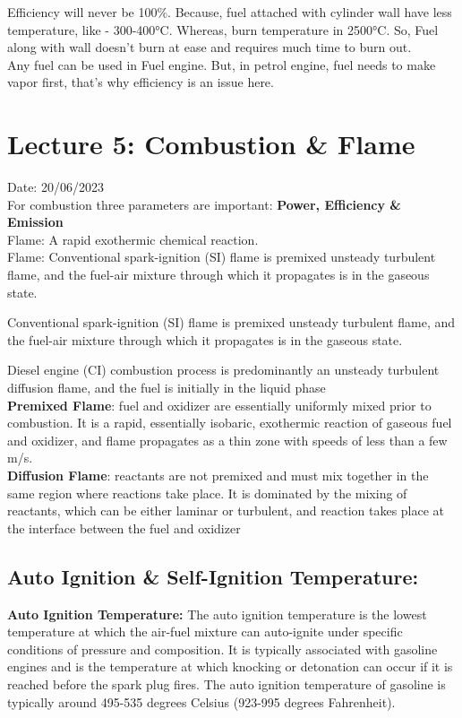 \documentclass{article}
\begin{document}
  Efficiency will never be 100\%. Because, fuel attached with cylinder wall have less temperature, like - 300-400°C. Whereas, burn temperature in 2500°C. So, Fuel along with wall doesn't burn at ease and requires much time to burn out. \\

  Any fuel can be used in Fuel engine. But, in petrol engine, fuel needs to make vapor first, that's why efficiency is an issue here. 

  \vspace*{0.5cm}
  \section{Lecture 5: Combustion \& Flame}
  \hfill Date: 20/06/2023 \\

  For combustion three parameters are important: \textbf{Power, Efficiency \& Emission}\\


  \textbullet Flame: A rapid exothermic chemical reaction. \\
  \textbullet Flame:  Conventional spark-ignition (SI) flame is premixed unsteady turbulent flame, and the fuel-air mixture through which it propagates is in the
  gaseous state.

  Conventional spark-ignition (SI) flame is premixed unsteady turbulent
  flame, and the fuel-air mixture through which it propagates is in the
  gaseous state.

  Diesel engine (CI) combustion process is predominantly an unsteady
  turbulent diffusion flame, and the fuel is initially in the liquid phase\\

  \textbf{Premixed Flame}: fuel and oxidizer are essentially uniformly mixed
  prior to combustion. It is a rapid, essentially isobaric, exothermic
  reaction of gaseous fuel and oxidizer, and flame propagates as a thin
  zone with speeds of less than a few m/s.\\

  \textbf{Diffusion Flame}: reactants are not premixed and must mix together
  in the same region where reactions take place. It is dominated by the
  mixing of reactants, which can be either laminar or turbulent, and
  reaction takes place at the interface between the fuel and oxidizer

  \subsection*{Auto Ignition \& Self-Ignition Temperature:}
  \textbf{Auto Ignition Temperature:} The auto ignition temperature is the lowest temperature at which the air-fuel mixture can auto-ignite under specific conditions of pressure and composition. It is typically associated with gasoline engines and is the temperature at which knocking or detonation can occur if it is reached before the spark plug fires. The auto ignition temperature of gasoline is typically around 495-535 degrees Celsius (923-995 degrees Fahrenheit).
\end{document}
